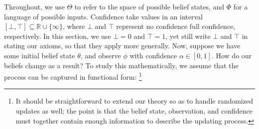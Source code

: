 
Throughout, we use $\Theta$ to refer to the space of possible belief states,
and $\Phi$ for a language of possible inputs. 
Confidence take values in an interval $[\bot,\!\top] \subseteq \mathbb R \cup \{\infty\}$, 
where $\bot$ and $\top$ represent no confidence
full confidence, respectively.
In this section, we use
$\bot = 0$ and $\top = 1$,
yet still write $\bot$ and $\top$ in stating our axioms, 
so that they apply more generally.
%
Now, suppose we have some initial belief state $\theta$, and observe $\phi$ with confidence $\alpha \in [0,1]$. 
How do our beliefs change as a result? 
To study this mathematically, we assume that the process can be captured in functional form:
\unskip\footnote{%
	It should be straightforward to extend our theory
	so as to handle randomized updates as well;
	the point is that
	the belief state, observation, and confidence must together contain
	enough information to describe the updating process.
	}

